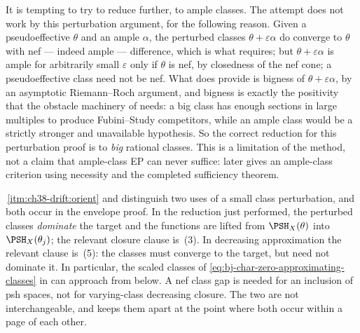 \begin{remark}
\label{rem:ch45-ample-insufficient}
It is tempting to try to reduce further, to ample classes.  The attempt
does not work by this perturbation argument, for the following reason.  Given a pseudoeffective $\theta$ and
an ample $\alpha$, the perturbed classes $\theta+\varepsilon\alpha$ do
converge to $\theta$ with nef --- indeed ample --- difference, which is what
 requires; but $\theta+\varepsilon\alpha$ is
ample for arbitrarily small $\varepsilon$ only if $\theta$ is nef, by
closedness of the nef cone; a pseudoeffective class need not be nef.
What  does provide is bigness of
$\theta+\varepsilon\alpha$, by an asymptotic Riemann--Roch argument, and
bigness is exactly the positivity that the obstacle machinery of
 needs: a big class has enough sections
in large multiples to produce Fubini--Study competitors, while an ample class
would be a strictly stronger and unavailable hypothesis.  So the correct
reduction for this perturbation proof is to \emph{big} rational classes.
This is a limitation of the method, not a claim that ample-class EP can
never suffice:  later gives
an ample-class criterion using necessity and the completed sufficiency
theorem.
\end{remark}

\begin{remark}
\label{rem:ch45-two-orientations}
\,\cref{itm:ch38-drift:orient} and
 distinguish two uses of a small class
perturbation, and both occur in the envelope proof.  In the reduction just
performed, the perturbed classes \emph{dominate} the target and the
functions are lifted from $\PSH_X(\theta)$ into $\PSH_X(\theta_j)$; the
relevant closure clause is \,(3).  In decreasing approximation the relevant clause is
\,(5): the classes must converge to the target,
but need not dominate it.  In particular, the scaled classes of
\eqref{eq:bj-char-zero-approximating-classes} in
 can approach from below.  A nef
class gap is needed for an inclusion of psh spaces, not for varying-class
decreasing closure.  The two are not interchangeable,
and  keeps them apart at the point where
both occur within a page of each other.
\end{remark}

